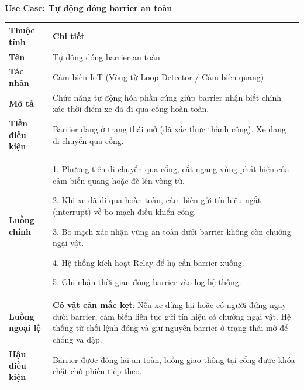 \noindent \textbf{Use Case: Tự động đóng barrier an toàn} \\
\renewcommand{\arraystretch}{1.6}
\begin{xltabular}{\textwidth}{|l|X|}
\hline
\textbf{Thuộc tính} & \textbf{Chi tiết} \\
\hline
\textbf{Tên} & Tự động đóng barrier an toàn \\
\hline
\textbf{Tác nhân} & Cảm biến IoT (Vòng từ Loop Detector / Cảm biến quang) \\
\hline
\textbf{Mô tả} & Chức năng tự động hóa phần cứng giúp barrier nhận biết chính xác thời điểm xe đã đi qua cổng hoàn toàn. \\
\hline
\textbf{Tiền điều kiện} & Barrier đang ở trạng thái mở (đã xác thực thành công). Xe đang di chuyển qua cổng. \\
\hline
\textbf{Luồng chính} & 
1. Phương tiện di chuyển qua cổng, cắt ngang vùng phát hiện của cảm biến quang hoặc đè lên vòng từ.

2. Khi xe đã đi qua hoàn toàn, cảm biến gửi tín hiệu ngắt (interrupt) về bo mạch điều khiển cổng.

3. Bo mạch xác nhận vùng an toàn dưới barrier không còn chướng ngại vật.

4. Hệ thống kích hoạt Relay để hạ cần barrier xuống.

5. Ghi nhận thời gian đóng barrier vào log hệ thống.
\\
\hline

\textbf{Luồng ngoại lệ} & 
\textbf{Có vật cản mắc kẹt}: Nếu xe dừng lại hoặc có người đứng ngay dưới barrier, cảm biến liên tục gửi tín hiệu có chướng ngại vật. Hệ thống từ chối lệnh đóng và giữ nguyên barrier ở trạng thái mở để chống va đập.
\\
\hline

\textbf{Hậu điều kiện} & Barrier được đóng lại an toàn, luồng giao thông tại cổng được khóa chặt chờ phiên tiếp theo.\\
\hline
\end{xltabular}


